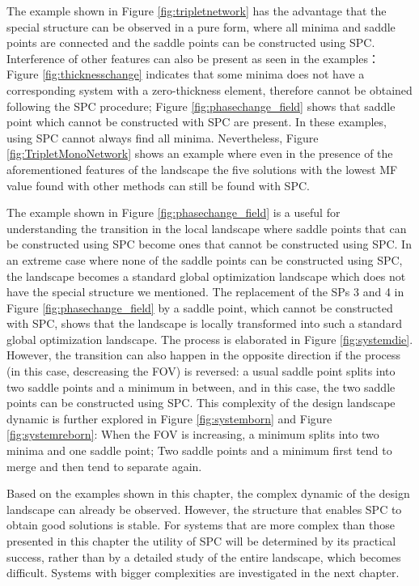 The example shown in Figure \ref{fig:tripletnetwork} has the advantage that the special structure can be observed in a pure form, where all minima and saddle points are connected and the saddle points can be constructed using SPC. Interference of other features can also be present as seen in the examples： Figure \ref{fig:thicknesschange} indicates that some minima does not have a corresponding system with a zero-thickness element, therefore cannot be obtained following the SPC procedure; Figure \ref{fig:phasechange_field} shows that saddle point which cannot be constructed with SPC are present. In these examples, using SPC cannot always find all minima. Nevertheless, Figure \ref{fig:TripletMonoNetwork} shows an example where even in the presence of the aforementioned features of the landscape the five solutions with the lowest MF value found with other methods can still be found with SPC.

The example shown in Figure \ref{fig:phasechange_field} is a useful for understanding the transition in the local landscape where saddle points that can be constructed using SPC become ones that cannot be constructed using SPC. In an extreme case where none of the saddle points can be constructed using SPC, the landscape becomes a standard global optimization landscape which does not have the special structure we mentioned. The replacement of the SPs 3 and 4 in Figure \ref{fig:phasechange_field} by a saddle point, which cannot be constructed with SPC, shows that the landscape is locally transformed into such a standard global optimization landscape. The process is elaborated in Figure \ref{fig:systemdie}. However, the transition can also happen in the opposite direction if the process (in this case, descreasing the FOV) is reversed: a usual saddle point splits into two saddle points and a minimum in between, and in this case, the two saddle points can be constructed using SPC. This complexity of the design landscape dynamic is further explored in Figure \ref{fig:systemborn} and Figure \ref{fig:systemreborn}: When the FOV is increasing, a minimum splits into two minima and one saddle point; Two saddle points and a minimum first tend to merge and then tend to separate again. 

Based on the examples shown in this chapter, the complex dynamic of the design landscape can already be observed. However, the structure that enables SPC to obtain good solutions is stable. For systems that are more complex than those presented in this chapter the utility of SPC will be determined by its practical success, rather than by a detailed study of the entire landscape, which becomes difficult. Systems with bigger complexities are investigated in the next chapter. 

